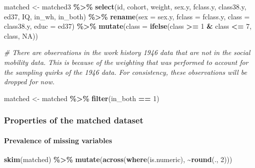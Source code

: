 \documentclass[
]{article}
\newenvironment{Shaded}{\begin{snugshade}}{\end{snugshade}}
\newcommand{\AttributeTok}[1]{\textcolor[rgb]{0.13,0.29,0.53}{#1}}
\newcommand{\CommentTok}[1]{\textcolor[rgb]{0.56,0.35,0.01}{\textit{#1}}}
\newcommand{\ConstantTok}[1]{\textcolor[rgb]{0.56,0.35,0.01}{#1}}
\newcommand{\DecValTok}[1]{\textcolor[rgb]{0.00,0.00,0.81}{#1}}
\newcommand{\FunctionTok}[1]{\textcolor[rgb]{0.13,0.29,0.53}{\textbf{#1}}}
\newcommand{\NormalTok}[1]{#1}
\newcommand{\OtherTok}[1]{\textcolor[rgb]{0.56,0.35,0.01}{#1}}
\newcommand{\SpecialCharTok}[1]{\textcolor[rgb]{0.81,0.36,0.00}{\textbf{#1}}}
\begin{document}
\begin{Shaded}
\begin{Highlighting}[]
\NormalTok{matched }\OtherTok{\textless{}{-}}\NormalTok{ matched3 }\SpecialCharTok{\%\textgreater{}\%}
  \FunctionTok{select}\NormalTok{(id, cohort, weight, sex.y, fclass.y, class38.y, ed37, }
\NormalTok{         IQ, in\_wh, in\_both) }\SpecialCharTok{\%\textgreater{}\%}
  \FunctionTok{rename}\NormalTok{(}\AttributeTok{sex =}\NormalTok{ sex.y, }\AttributeTok{fclass =}\NormalTok{ fclass.y, }\AttributeTok{class =}\NormalTok{ class38.y,}
         \AttributeTok{educ =}\NormalTok{ ed37) }\SpecialCharTok{\%\textgreater{}\%}
  \FunctionTok{mutate}\NormalTok{(}\AttributeTok{class =} \FunctionTok{ifelse}\NormalTok{(class }\SpecialCharTok{\textgreater{}=} \DecValTok{1} \SpecialCharTok{\&}\NormalTok{ class }\SpecialCharTok{\textless{}=} \DecValTok{7}\NormalTok{, class, }\ConstantTok{NA}\NormalTok{))}

\CommentTok{\# There are observations in the work history 1946 data that are not in the social mobility data. This is because of the weighting that was performed to account for the sampling quirks of the 1946 data. For consistency, these observations will be dropped for now. }

\NormalTok{matched }\OtherTok{\textless{}{-}}\NormalTok{ matched }\SpecialCharTok{\%\textgreater{}\%} \FunctionTok{filter}\NormalTok{(in\_both }\SpecialCharTok{==} \DecValTok{1}\NormalTok{)}
\end{Highlighting}
\end{Shaded}

\subsubsection{Properties of the matched
dataset}\label{properties-of-the-matched-dataset}

\paragraph{Prevalence of missing
variables}\label{prevalence-of-missing-variables}

\begin{Shaded}
\begin{Highlighting}[]
\FunctionTok{skim}\NormalTok{(matched) }\SpecialCharTok{\%\textgreater{}\%}
  \FunctionTok{mutate}\NormalTok{(}\FunctionTok{across}\NormalTok{(}\FunctionTok{where}\NormalTok{(is.numeric), }\SpecialCharTok{\textasciitilde{}}\FunctionTok{round}\NormalTok{(., }\DecValTok{2}\NormalTok{)))}
\end{Highlighting}
\end{Shaded}
\end{document}

